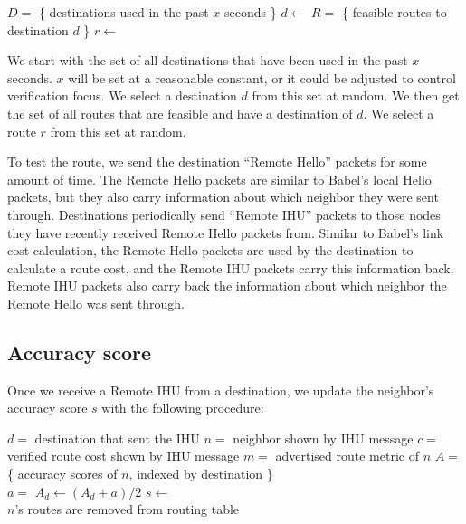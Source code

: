\documentclass[11pt]{article}
\begin{document}
\noindent
\begin{minipage}[c]{\textwidth}
\vspace{\abovedisplayskip}
\begin{algorithmic}
\State $D=$ \{ destinations used in the past $x$ seconds \}
\State $d\gets$ 
\State $R=$ \{ feasible routes to destination $d$ \}
\State $r\gets$ 
\end{algorithmic}
\vspace{\belowdisplayskip}
\end{minipage}

We start with the set of all destinations that have been used in the past $x$ seconds. $x$ will be set at a reasonable constant, or it could be adjusted to control verification focus. We select a destination $d$ from this set at random. We then get the set of all routes that are feasible and have a destination of $d$. We select a route $r$ from this set at random.

To test the route, we send the destination ``Remote Hello'' packets for some amount of time. The Remote Hello packets are similar to Babel’s local Hello packets, but they also carry information about which neighbor they were sent through. Destinations periodically send ``Remote IHU'' packets to those nodes they have recently received Remote Hello packets from. Similar to Babel’s link cost calculation, the Remote Hello packets are used by the destination to calculate a route cost, and the Remote IHU packets carry this information back. Remote IHU packets also carry back the information about which neighbor the Remote Hello was sent through.

\subsection{Accuracy score}
\label{sec:accuracy}
Once we receive a Remote IHU from a destination, we update the neighbor’s accuracy score $s$ with the following procedure:

\noindent
\begin{minipage}[c]{\textwidth}
\vspace{\abovedisplayskip}
\begin{algorithmic}
\State $d=$ destination that sent the IHU
\State $n=$ neighbor shown by IHU message
\State $c=$ verified route cost shown by IHU message
\State $m=$ advertised route metric of $n$
\State $A=$ \{ accuracy scores of $n$, indexed by destination \}\\
\State $a=$ 
\State $A_d\gets (A_d+a)/2$
\State $s\gets$ \\
\State $n$'s routes are removed from routing table
\EndIf
\end{algorithmic}
\vspace{\belowdisplayskip}
\end{minipage}
\end{document}
